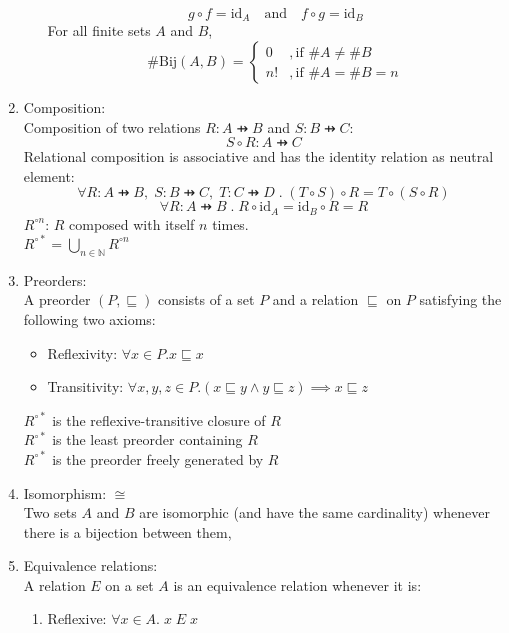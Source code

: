 \documentclass{article}
\begin{document}
\begin{enumerate}
\begin{itemize}[label={-},topsep=0pt]
                $$g\circ f=\text{id}_A\quad\text{and}\quad f\circ g=\text{id}_B$$
                For all finite sets $A$ and $B$,
                $$\#\text{Bij}(A,B)=\begin{cases}
                    0 &, \text{if }\#A\neq\#B\\
                    n! &, \text{if }\#A=\#B=n
                \end{cases}$$
        \end{itemize}
    \item Composition:\\
        Composition of two relations $R:A\pfun B$ and $S:B\pfun C$: 
            $$S\circ R:A\pfun C$$
        Relational composition is associative and has the identity relation as neutral element:
            $$\forall R:A\pfun B,\;S:B\pfun C,\;T:C\pfun D\;.\;(T\circ S)\circ R=T\circ(S\circ R)$$
            $$\forall R:A\pfun B\;.\;R\circ\text{id}_A=\text{id}_B\circ R=R$$
        $R^{\circ n}$: $R$ composed with itself $n$ times.\\
        $R^{\circ*}=\bigcup_{n\in\mathbb{N}}R^{\circ n}$
    \newpage
    \item Preorders:\\
        A preorder $(P,\sqsubseteq)$ consists of a set $P$ and a relation $\sqsubseteq$ on $P$ satisfying the following two axioms:
        \begin{itemize}[label={-},topsep=0pt]
            \item Reflexivity: $\forall x\in P.x\sqsubseteq x$
            \item Transitivity: $\forall x,y,z\in P.(x\sqsubseteq y\wedge y\sqsubseteq z)\implies x\sqsubseteq z$
        \end{itemize}
        $R^{\circ*}$ is the reflexive-transitive closure of $R$\\
        $R^{\circ*}$ is the least preorder containing $R$\\
        $R^{\circ*}$ is the preorder freely generated by $R$
    \item Isomorphism: $\cong$\\
        Two sets $A$ and $B$ are isomorphic (and have the same cardinality) whenever there is a bijection between them,
    \item Equivalence relations:\\
        A relation $E$ on a set $A$ is an equivalence relation whenever it is:
        \begin{enumerate}[label=(\arabic*),topsep=0pt]
            \item Reflexive: $\forall x\in A.\;x\;E\;x$

\end{enumerate}
\end{enumerate}
\end{document}
